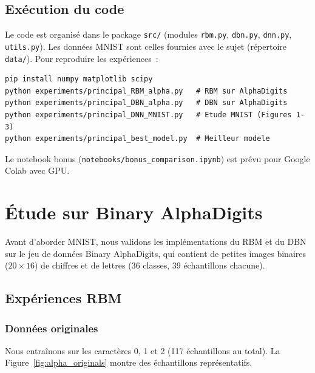 \documentclass[11pt,a4paper]{article}
\begin{document}
\subsection{Ex\'ecution du code}

Le code est organis\'e dans le package \texttt{src/} (modules \texttt{rbm.py}, \texttt{dbn.py}, \texttt{dnn.py}, \texttt{utils.py}). Les donn\'ees MNIST sont celles fournies avec le sujet (r\'epertoire \texttt{data/}). Pour reproduire les exp\'eriences~:

\begin{lstlisting}
pip install numpy matplotlib scipy
python experiments/principal_RBM_alpha.py   # RBM sur AlphaDigits
python experiments/principal_DBN_alpha.py   # DBN sur AlphaDigits
python experiments/principal_DNN_MNIST.py   # Etude MNIST (Figures 1-3)
python experiments/principal_best_model.py  # Meilleur modele
\end{lstlisting}

Le notebook bonus (\texttt{notebooks/bonus\_comparison.ipynb}) est pr\'evu pour Google Colab avec GPU.

\section{\'Etude sur Binary AlphaDigits}
\label{sec:alpha}

Avant d'aborder MNIST, nous validons les impl\'ementations du RBM et du DBN sur le jeu de donn\'ees Binary AlphaDigits, qui contient de petites images binaires ($20 \times 16$) de chiffres et de lettres (36 classes, 39 \'echantillons chacune).

\subsection{Exp\'eriences RBM}
\label{sec:rbm_alpha}

\subsubsection{Donn\'ees originales}

Nous entra\^inons sur les caract\`eres 0, 1 et 2 (117 \'echantillons au total). La Figure~\ref{fig:alpha_originals} montre des \'echantillons repr\'esentatifs.
\end{document}
